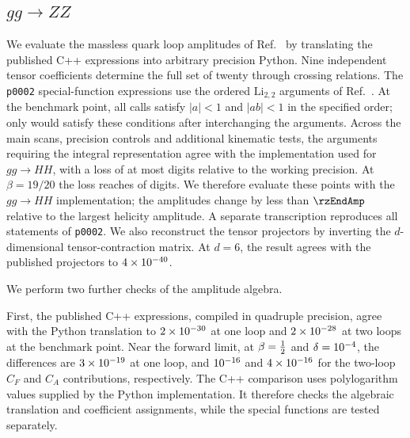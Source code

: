 \documentclass[%
 onecolumn,
 superscriptaddress,
 preprintnumbers,
 nofootinbib,
 amsmath,amssymb,
 aps,
 prl,
]{revtex4-2}
\begin{document}
\subsection{\texorpdfstring{$gg\to ZZ$}{gg -> ZZ}}

We evaluate the massless quark loop amplitudes
of Ref.~\cite{vonManteuffel:2015msa} by
translating the published C++ expressions
into arbitrary precision Python.
Nine independent tensor coefficients determine
the full set of twenty through crossing relations.
%
The \texttt{p0002} special-function expressions
use the ordered $\mathrm{Li}_{2,2}$ arguments
of Ref.~\cite{Gehrmann:2015ora}.
At the benchmark point, all \zzLiCalls{}
calls satisfy $|a|<1$ and $|ab|<1$
in the specified order; only
\zzLiSwapped{} would satisfy these conditions
after interchanging the arguments.
%
Across the main scans, precision controls
and additional kinematic tests, the
\zzLiScanArgs{} arguments requiring the
integral representation agree with the
implementation used for $gg\to HH$,
with a loss of at most \zzLiScanDigits{}
digits relative to the working precision.
At $\beta=19/20$ the loss reaches
\rzEndLiLost{} of \rzEndLiDps{} digits.
We therefore evaluate these points with
the $gg\to HH$ implementation; the
amplitudes change by less than $\rzEndAmp$
relative to the largest helicity amplitude.
A separate transcription reproduces all
\zzPzeroStatements{} statements of
\texttt{p0002}.
We also reconstruct the tensor projectors
by inverting the $d$-dimensional
tensor-contraction matrix. At $d=6$,
the result agrees with the published
projectors to $4\times10^{-40}$.

We perform two further checks of the
amplitude algebra.

First, the published C++ expressions,
compiled in quadruple precision,
agree with the Python translation to
$2\times10^{-30}$ at one loop
and $2\times10^{-28}$ at two loops
at the benchmark point.
Near the forward limit, at
$\beta=\frac12$ and
$\delta=10^{-4}$, the differences
are $3\times10^{-19}$ at one loop,
and $10^{-16}$ and $4\times10^{-16}$
for the two-loop $C_F$ and $C_A$
contributions, respectively.
The C++ comparison uses polylogarithm
values supplied by the Python implementation.
It therefore checks the algebraic translation
and coefficient assignments, while the
special functions are tested separately.
\end{document}
